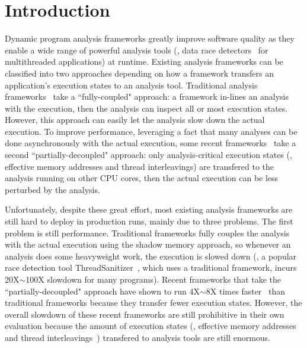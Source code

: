 \section{Introduction} \label{sec:intro}



Dynamic program analysis frameworks greatly improve software quality as they
enable a wide range of powerful analysis tools (\eg, data race
detectors~\cite{tsan, valgrind:pldi, wester:parallelizing:asplos13} for
multithreaded applications) at runtime. Existing analysis frameworks can be
classified into two approaches depending on how a framework transfers an
application's execution states to an analysis tool. Traditional analysis
frameworks~\cite{dynamorio, pin:pldi05, valgrind:pldi, lift:micro06, tsan} take
a ``fully-coupled" approach: a framework in-lines an analysis with the
execution, then the analysis can inspect all or most execution states. However,
this approach can easily let the analysis slow down the actual execution. To
improve performance, leveraging a fact that many analyses can be done
asynchronously with the actual execution, some recent
frameworks~\cite{decouple:usenix08, speck:asplos08, 
shadowreplica:ccs13, wester:parallelizing:asplos13, superpin, jungwoo:oopsla09}
take a second ``partially-decoupled" approach: only analysis-critical execution
states (\eg, effective memory addresses and thread interleavings) are
transfered to the analysis running on other CPU cores, then the actual execution
can be less perturbed by the analysis.




Unfortunately, despite these great effort, most existing analysis frameworks are
still hard to deploy in production runs, mainly due to three problems. The first
problem is still performance. Traditional frameworks fully couples the analysis
with the actual execution using the shadow memory approach, so whenever an
analysis does some heavyweight work, the execution is slowed down (\eg, a
popular race detection tool ThreadSanitizer~\cite{tsan}, which uses a
traditional framework, incurs 20X$\sim$100X slowdown for many programs). Recent
frameworks that take the ``partially-decoupled" approach have shown to run
4X$\sim$8X times faster~\cite{shadowreplica:ccs13,
wester:parallelizing:asplos13} than traditional frameworks because they transfer
fewer 
execution states. However, the overall slowdown of these recent frameworks are
still prohibitive in their own evaluation because the amount of execution states
(\eg, effective memory addresses~\cite{shadowreplica:ccs13} and thread
interleavings~\cite{wester:parallelizing:asplos13}) transfered to analysis tools
are still enormous.


